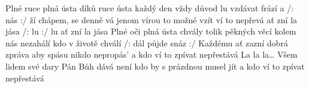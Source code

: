 \begin{TEXT}{Plné ruce plná ústa díků}
\SLOKA {} ruce  ústa  \NL
každý den vždy  důvod  \NL
{}lu vzdávat  frází a  /:  nás  :/ \NL
{}ží chápem,  se denně vá \NL
jenom vírou  to možné vzít \NL
{} ví to  nepřevá 
\REFREN  {}    ať zní la jása \NL
/: lu :/     lu ať zní la jása  
\SLOKA Plné oči plná ústa chvály \NL
tolik pěkných věcí kolem nás \NL
nezahálí kdo v životě chválí /: dál půjde snáz :/ \NL
Každému ať zazní dobrá zpráva \NL
aby spásu nikdo nepropás' \NL
a kdo ví to zpívat nepřestává 
\SLOKA La la la… \NL
Všem lidem své dary Pán Bůh dává \NL
není kdo by s prázdnou musel jít \NL
a kdo ví to zpívat nepřestává \NL
\end{TEXT}
